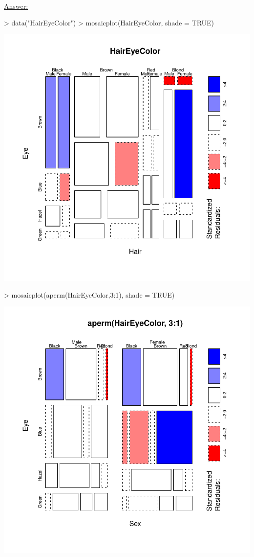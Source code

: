 \documentclass[12pt,letterpaper,final]{article}
\begin{document}
\begin{enumerate}
\begin{enumerate}
\underline{Answer:}
{\scriptsize
\begin{Schunk}
\begin{Sinput}
> data("HairEyeColor")
> mosaicplot(HairEyeColor, shade = TRUE)
\end{Sinput}
\end{Schunk}
\includegraphics{hw02_bartschi-010}
\newpage
\begin{Schunk}
\begin{Sinput}
> mosaicplot(aperm(HairEyeColor,3:1), shade = TRUE)
\end{Sinput}
\end{Schunk}
\includegraphics{hw02_bartschi-011}
}
\end{enumerate}
\end{enumerate}
\end{document}
